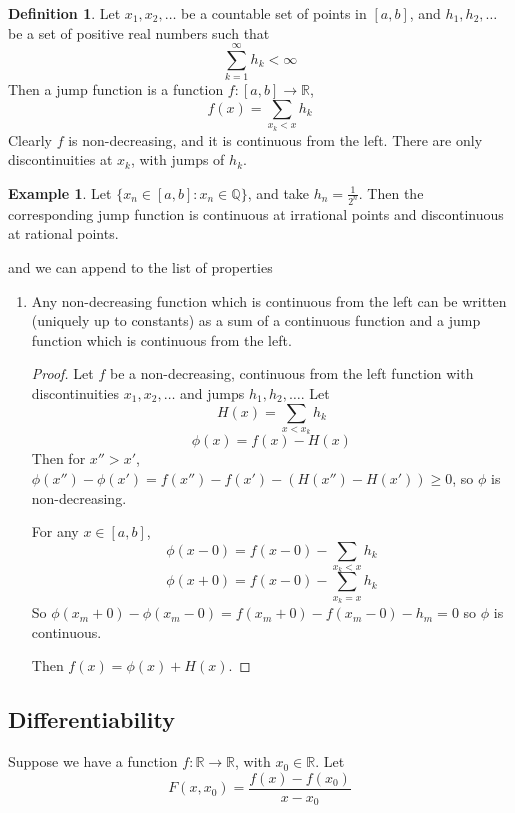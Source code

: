 \documentclass[11pt,a4paper]{report}
\theoremstyle{plain}
\theoremstyle{definition}
\newtheorem*{defn}{Definition}
\newtheorem*{eg}{Example}
\theoremstyle{remark}
\newcommand{\R}{\mathbb{R}}
\newcommand{\Q}{\mathbb{Q}}
\begin{document}
\begin{defn}
  Let $x_1, x_2, \dots$ be a countable set of points in $[a, b]$, and $h_1, h_2, \dots$ be a set of positive real numbers such that 
  $$ \sum_{k=1}^\infty h_k < \infty $$
  Then a jump function is a function $f : [a, b] \to \R$,
  $$ f(x) = \sum_{x_k < x} h_k $$
  Clearly $f$ is non-decreasing, and it is continuous from the left. There are only discontinuities at $x_k$, with jumps of $h_k$.
\end{defn}

\begin{eg}
  Let $\{ x_n \in [a, b] : x_n \in \Q \}$, and take $h_n = \frac{1}{2^n}$. Then the corresponding jump function is continuous at irrational points and discontinuous at rational points.
\end{eg}

and we can append to the list of properties
\begin{enumerate}
  \item Any non-decreasing function which is continuous from the left can be written (uniquely up to constants) as a sum of a continuous function and a jump function which is continuous from the left.

    \begin{proof}
      Let $f$ be a non-decreasing, continuous from the left function with discontinuities $x_1, x_2, \dots$ and jumps $h_1, h_2, \dots$. Let
      $$ H(x) = \sum_{x < x_k} h_k $$
      $$ \phi(x) = f(x) - H(x) $$
      Then for $x'' > x'$, $\phi(x'') - \phi(x') = f(x'') - f(x') - (H(x'') - H(x')) \ge 0$, so $\phi$ is non-decreasing.

      For any $x \in [a, b]$,
        $$ \phi(x - 0) = f(x - 0) - \sum_{x_k < x} h_k $$
        $$ \phi(x + 0) = f(x - 0) - \sum_{x_k = x} h_k $$
      So $\phi(x_m + 0) - \phi(x_m - 0) = f(x_m + 0) - f(x_m - 0) - h_m = 0$ so $\phi$ is continuous.

      Then $f(x) = \phi(x) + H(x)$.
    \end{proof}
\end{enumerate}


\subsection{Differentiability}

Suppose we have a function $f : \R \to \R$, with $x_0 \in \R$. Let
$$ F(x, x_0) = \frac{f(x) - f(x_0)}{x - x_0} $$
\end{document}

